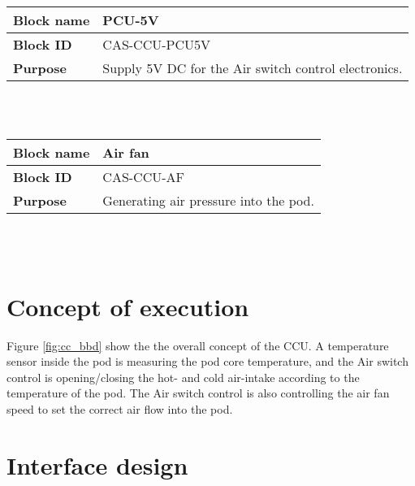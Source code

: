\begin{tabular}{|l|p{10cm}|}
    \hline
    \textbf{Block name}     & PCU-5V \\
    \hline
    \textbf{Block ID}       & CAS-CCU-PCU5V \\
    \hline
    \textbf{Purpose}        & Supply 5V DC for the Air switch control electronics. \\
    \hline
\end{tabular}\\\\

\begin{tabular}{|l|p{10cm}|}
    \hline
    \textbf{Block name}     & Air fan \\
    \hline
    \textbf{Block ID}       & CAS-CCU-AF \\
    \hline
    \textbf{Purpose}        & Generating air pressure into the pod. \\
    \hline
\end{tabular}\\\\

\pagebreak

\section{Concept of execution}
\label{sec:concept_execution}

Figure \ref{fig:cc_bbd} show the the overall concept of the CCU. A temperature sensor inside the pod is measuring the pod core temperature, and the Air switch control is opening/closing the hot- and cold air-intake according to the temperature of the pod. The Air switch control is also controlling the air fan speed to set the correct air flow into the pod.


\section{Interface design}
\label{sec:arch_interface}

